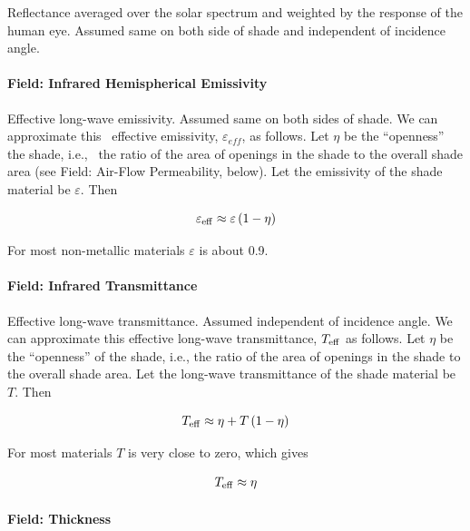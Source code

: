 Reflectance averaged over the solar spectrum and weighted by the response of the human eye. Assumed same on both side of shade and independent of incidence angle.

\paragraph{Field: Infrared Hemispherical Emissivity}\label{field-infrared-hemispherical-emissivity-201710020805}

Effective long-wave emissivity. Assumed same on both sides of shade. We can approximate this~ effective emissivity, \(\varepsilon_{eff}\), as follows. Let \(\eta\) be the ``openness'' the shade, i.e.,~ the ratio of the area of openings in the shade to the overall shade area (see Field: Air-Flow Permeability, below). Let the emissivity of the shade material be \(\varepsilon\). Then

\begin{equation}
{\varepsilon_{{\rm{eff}}}} \approx \varepsilon \left( {1 - \eta } \right)
\end{equation}

For most non-metallic materials \(\varepsilon\) is about 0.9.

\paragraph{Field: Infrared Transmittance}\label{field-infrared-transmittance}

Effective long-wave transmittance. Assumed independent of incidence angle. We can approximate this effective long-wave transmittance, \(T_{\rm{eff}}\) as follows. Let \(\eta\) be the ``openness'' of the shade, i.e., the ratio of the area of openings in the shade to the overall shade area. Let the long-wave transmittance of the shade material be \(T\). Then

\begin{equation}
T_{\rm{eff}} \approx \eta + T \left( 1 - \eta \right)
\end{equation}

For most materials \(T\) is very close to zero, which gives

\begin{equation}
T_{\rm{eff}} \approx \eta
\end{equation}

\paragraph{Field: Thickness}\label{field-thickness-6}

